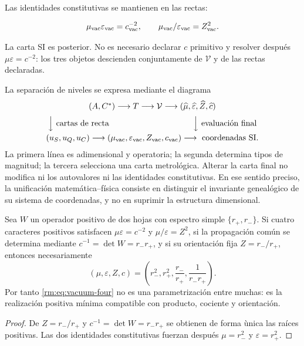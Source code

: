 Las identidades constitutivas se mantienen en las rectas:

\begin{equation}
\mu_{\rm vac}\varepsilon_{\rm vac}=c_{\rm vac}^{-2},
\qquad
\mu_{\rm vac}/\varepsilon_{\rm vac}=Z_{\rm vac}^2.
\end{equation}

La carta SI es posterior. No es necesario declarar \(c\) primitivo y resolver despu\'es \(\mu\varepsilon=c^{-2}\): los tres objetos descienden conjuntamente de \(\mathcal V\) y de las rectas declaradas.

La separaci\'on de niveles se expresa mediante el diagrama
\[
\begin{array}{c}
(A,C^*)\longrightarrow T\longrightarrow\mathcal V
\longrightarrow
(\widehat\mu,\widehat\varepsilon,\widehat Z,\widehat c)
\\[2mm]
\Big\downarrow\text{ cartas de recta}\hspace{36mm}
\Big\downarrow\text{ evaluaci\'on final}
\\[2mm]
(u_S,u_Q,u_C)\longrightarrow
(\mu_{\rm vac},\varepsilon_{\rm vac},Z_{\rm vac},c_{\rm vac})
\longrightarrow\text{ coordenadas SI}.
\end{array}
\]
La primera l\'inea es adimensional y operatoria; la segunda determina tipos de
magnitud; la tercera selecciona una carta metrol\'ogica. Alterar la carta final
no modifica ni los autovalores ni las identidades constitutivas. En ese
sentido preciso, la unificaci\'on matem\'atica--f\'isica consiste en distinguir
el invariante geneal\'ogico de su sistema de coordenadas, y no en suprimir la
estructura dimensional.

\begin{proposition}
Sea \(W\) un operador positivo de dos hojas con espectro simple
\(\{r_+,r_-\}\). Si cuatro caracteres positivos satisfacen
\(\mu\varepsilon=c^{-2}\) y \(\mu/\varepsilon=Z^2\), si la propagaci\'on
com\'un se determina mediante \(c^{-1}=\det W=r_-r_+\), y si su orientaci\'on
fija \(Z=r_-/r_+\), entonces necesariamente
\[
(\mu,\varepsilon,Z,c)
=\left(r_-^2,r_+^2,\frac{r_-}{r_+},\frac1{r_-r_+}\right).
\]
Por tanto \cref{rm:eq:vacuum-four} no es una parametrizaci\'on entre muchas:
es la realizaci\'on positiva m\'inima compatible con producto, cociente y
orientaci\'on.
\end{proposition}

\begin{proof}
De \(Z=r_-/r_+\) y \(c^{-1}=\det W=r_-r_+\) se obtienen de forma \`unica las
ra\'ices positivas. Las dos identidades constitutivas fuerzan despu\'es
\(\mu=r_-^2\) y \(\varepsilon=r_+^2\).
\end{proof}

